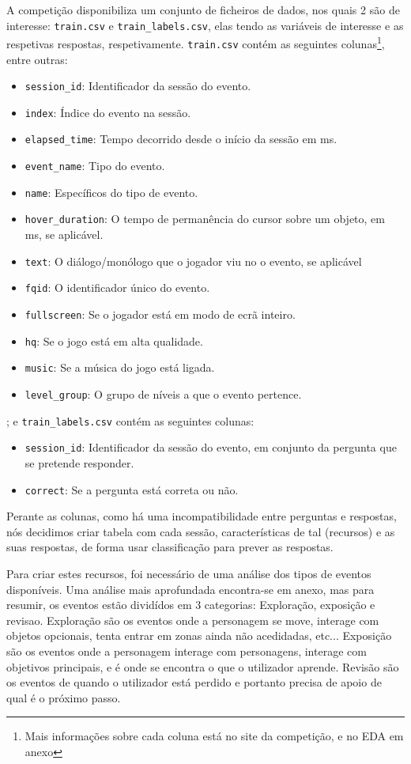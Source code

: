 \documentclass[justified, 11pt]{scrartcl}
\begin{document}
  A competição disponibiliza um conjunto de ficheiros de dados, nos quais 2 são de interesse: \texttt{train.csv} e \texttt{train\_labels.csv}, elas tendo as variáveis de interesse e as respetivas respostas, respetivamente. \texttt{train.csv} contém as seguintes colunas\footnote{Mais informações sobre cada coluna está no site da competição, e no EDA em anexo}, entre outras:
  \begin{itemize}
    \item \texttt{session\_id}: Identificador da sessão do evento.
    \item \texttt{index}: Índice do evento na sessão.
    \item \texttt{elapsed\_time}: Tempo decorrido desde o início da sessão em \si{\milli\second}.
    \item \texttt{event\_name}: Tipo do evento.
    \item \texttt{name}: Específicos do tipo de evento.
    \item \texttt{hover\_duration}: O tempo de permanência do cursor sobre um objeto, em \si{\milli\second}, se aplicável.
    \item \texttt{text}: O diálogo/monólogo que o jogador viu no o evento, se aplicável
    \item \texttt{fqid}: O identificador único do evento.
    \item \texttt{fullscreen}: Se o jogador está em modo de ecrã inteiro.
    \item \texttt{hq}: Se o jogo está em alta qualidade.
    \item \texttt{music}: Se a música do jogo está ligada.
    \item \texttt{level\_group}: O grupo de níveis a que o evento pertence.
  \end{itemize}
  ; e \texttt{train\_labels.csv} contém as seguintes colunas:
  \begin{itemize}
    \item \texttt{session\_id}: Identificador da sessão do evento, em conjunto da pergunta que se pretende responder.
    \item \texttt{correct}: Se a pergunta está correta ou não.
  \end{itemize}

  Perante as colunas, como há uma incompatibilidade entre perguntas e respostas, nós decidimos criar tabela com cada sessão, características de tal (recursos) e as suas respostas, de forma usar classificação para prever as respostas.

  Para criar estes recursos, foi necessário de uma análise dos tipos de eventos disponíveis. Uma análise mais aprofundada encontra-se em anexo, mas para resumir, os eventos estão dividídos em 3 categorias: Exploração, exposição e revisao. Exploração são os eventos onde a personagem se move, interage com objetos opcionais, tenta entrar em zonas ainda não acedidadas, etc... Exposição são os eventos onde a personagem interage com personagens, interage com objetivos principais, e é onde se encontra o que o utilizador aprende. Revisão são os eventos de quando o utilizador está perdido e portanto precisa de apoio de qual é o próximo passo.
\end{document}
